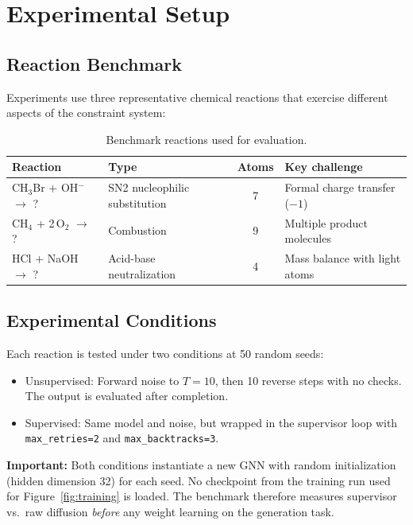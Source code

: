 \documentclass[11pt]{article}
\begin{document}
\section{Experimental Setup}
\label{sec:experimental-setup}

\subsection{Reaction Benchmark}

Experiments use three representative chemical reactions that exercise
different aspects of the constraint system:

\begin{table}[H]
\centering
\caption{Benchmark reactions used for evaluation.}
\label{tab:reactions}
\begin{tabular}{@{}llcl@{}}
\toprule
Reaction & Type & Atoms & Key challenge \\
\midrule
CH$_3$Br + OH$^-$ $\to$ ? & SN2 nucleophilic substitution & 7 &
  Formal charge transfer ($-1$) \\
CH$_4$ + 2\,O$_2$ $\to$ ? & Combustion & 9 &
  Multiple product molecules \\
HCl + NaOH $\to$ ? & Acid-base neutralization & 4 &
  Mass balance with light atoms \\
\bottomrule
\end{tabular}
\end{table}

\subsection{Experimental Conditions}

Each reaction is tested under two conditions at 50 random seeds:

\begin{itemize}[nosep]
  \item Unsupervised: Forward noise to $T{=}10$, then 10 reverse steps
        with no checks. The output is evaluated after completion.
  \item Supervised: Same model and noise, but wrapped in the supervisor
        loop with \texttt{max\_retries=2} and
        \texttt{max\_backtracks=3}.
\end{itemize}

\textbf{Important:} Both conditions instantiate a new GNN with random
initialization (hidden dimension 32) for each seed. No checkpoint from the
training run used for Figure~\ref{fig:training} is loaded. The benchmark
therefore measures supervisor vs.\ raw diffusion \emph{before} any weight
learning on the generation task.
\end{document}
